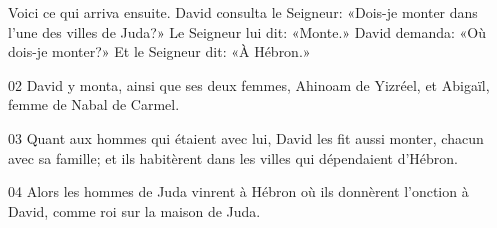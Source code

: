 Voici ce qui arriva ensuite. David consulta le Seigneur: «Dois-je monter dans l’une des villes de Juda?» Le Seigneur lui dit: «Monte.» David demanda: «Où dois-je monter?» Et le Seigneur dit: «À Hébron.»

02 David y monta, ainsi que ses deux femmes, Ahinoam de Yizréel, et Abigaïl, femme de Nabal de Carmel.

03 Quant aux hommes qui étaient avec lui, David les fit aussi monter, chacun avec sa famille; et ils habitèrent dans les villes qui dépendaient d’Hébron.

04 Alors les hommes de Juda vinrent à Hébron où ils donnèrent l’onction à David, comme roi sur la maison de Juda. 